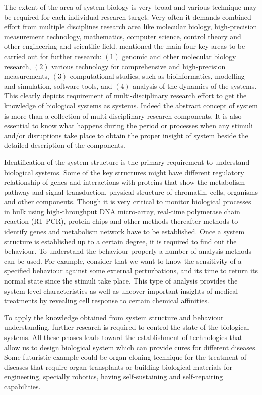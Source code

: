 The extent of the area of system biology is very broad and various technique may be required for each individual research target. Very often it demands combined effort from multiple disciplines research area like molecular biology, high-precision measurement technology, mathematics, computer science, control theory and other engineering and scientific field. \cite{Kitano:2002} mentioned the main four key areas to be carried out for further research: $(1)$ genomic and other molecular biology research, $(2)$ various technology for comprehensive and high-precision measurements, $(3)$ computational studies, such as bioinformatics, modelling and simulation, software tools, and $(4)$ analysis of the dynamics of the systems. This clearly depicts requirement of multi-disciplinary research effort to get the knowledge of biological systems as systems. Indeed the abstract concept of system is more than a collection of multi-disciplinary research components. It is also essential to know what happens during the period or processes when any stimuli and/or disruptions take place to obtain the proper insight of system beside the detailed description of the components.

Identification of the system structure is the primary requirement to understand biological systems. Some of the key structures might have different regulatory relationship of genes and interactions with proteins that show the metabolism pathway and signal transduction, physical structure of chromatin, cells, organisms and other components. Though it is very critical to monitor biological processes in bulk using high-throughput DNA micro-array, real-time polymerase chain reaction (RT-PCR), protein chips and other methods thereafter methods to identify genes and metabolism network have to be established. Once a system structure is established up to a certain degree, it is required to find out the behaviour. To understand the behaviour properly a number of analysis methods can be used. For example, consider that we want to know the sensitivity of a specified behaviour against some external perturbations, and its time to return its normal state since the stimuli take place. This type of analysis provides the system level characteristics as well as uncover important insights of medical treatments by revealing cell response to certain chemical affinities. 

To apply the knowledge obtained from system structure and behaviour understanding, further research is required to control the state of the biological systems. All these phases leads toward the establishment of technologies that allow us to design biological system which can provide cures for different diseases. Some futuristic example could be organ cloning technique for the treatment of diseases that require organ transplants or building biological materials for engineering, specially robotics, having self-sustaining and self-repairing capabilities.

